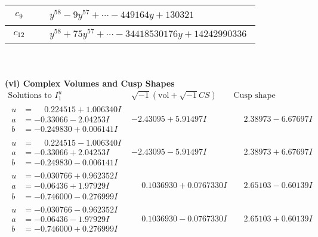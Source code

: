 \documentclass[1p]{elsarticle_modified}
\theoremstyle{definition}
\newcommand{\I}{\sqrt{-1}}
\begin{document}
\begin{tabular}{m{50pt}|m{274pt}}
\hline $$\begin{aligned}c_{9}\end{aligned}$$&$\begin{aligned}
&y^{58}-9 y^{57}+\cdots-449164 y+130321
\end{aligned}$\\
\hline $$\begin{aligned}c_{12}\end{aligned}$$&$\begin{aligned}
&y^{58}+75 y^{57}+\cdots-34418530176 y+14242990336
\end{aligned}$\\
\hline
\end{tabular}\\~\\
\newpage\flushleft \textbf{(vi) Complex Volumes and Cusp Shapes}
$$\begin{array}{c|c|c}  
\text{Solutions to }I^u_{1}& \I (\text{vol} + \sqrt{-1}CS) & \text{Cusp shape}\\
 \hline 
\begin{aligned}
u &= \phantom{-}0.224515 + 1.006340 I \\
a &= -0.33066 - 2.04253 I \\
b &= -0.249830 + 0.006141 I\end{aligned}
 & -2.43095 + 5.91497 I & \phantom{-}2.38973 - 6.67697 I \\ \hline\begin{aligned}
u &= \phantom{-}0.224515 - 1.006340 I \\
a &= -0.33066 + 2.04253 I \\
b &= -0.249830 - 0.006141 I\end{aligned}
 & -2.43095 - 5.91497 I & \phantom{-}2.38973 + 6.67697 I \\ \hline\begin{aligned}
u &= -0.030766 + 0.962352 I \\
a &= -0.06436 + 1.97929 I \\
b &= -0.746000 - 0.276999 I\end{aligned}
 & \phantom{-}0.1036930 + 0.0767330 I & \phantom{-}2.65103 - 0.60139 I \\ \hline\begin{aligned}
u &= -0.030766 - 0.962352 I \\
a &= -0.06436 - 1.97929 I \\
b &= -0.746000 + 0.276999 I\end{aligned}
 & \phantom{-}0.1036930 - 0.0767330 I & \phantom{-}2.65103 + 0.60139 I \\ \hline\begin{aligned}

\end{aligned}
\end{array}$$
\end{document}
